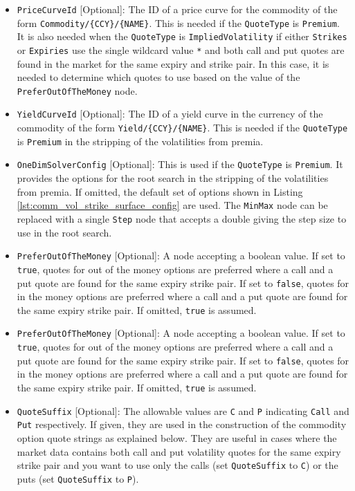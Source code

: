 \begin{itemize}
\item \lstinline!PriceCurveId! [Optional]:
The ID of a price curve for the commodity of the form \lstinline!Commodity/{CCY}/{NAME}!. This is needed if the \lstinline!QuoteType! is \lstinline!Premium!. It is also needed when the \lstinline!QuoteType! is \lstinline!ImpliedVolatility! if either \lstinline!Strikes! or \lstinline!Expiries! use the single wildcard value \lstinline!*! and both call and put quotes are found in the market for the same expiry and strike pair. In this case, it is needed to determine which quotes to use based on the value of the \lstinline!PreferOutOfTheMoney! node.

\item \lstinline!YieldCurveId! [Optional]:
The ID of a yield curve in the currency of the commodity of the form \lstinline!Yield/{CCY}/{NAME}!. This is needed if the \lstinline!QuoteType! is \lstinline!Premium! in the stripping of the volatilities from premia.

\item \lstinline!OneDimSolverConfig! [Optional]:
This is used if the \lstinline!QuoteType! is \lstinline!Premium!. It provides the options for the root search in the stripping of the volatilities from premia. If omitted, the default set of options shown in Listing \ref{lst:comm_vol_strike_surface_config} are used. The \lstinline!MinMax! node can be replaced with a single \lstinline!Step! node that accepts a double giving the step size to use in the root search.

\item \lstinline!PreferOutOfTheMoney! [Optional]:
A node accepting a boolean value. If set to \lstinline!true!, quotes for out of the money options are preferred where a call and a put quote are found for the same expiry strike pair. If set to \lstinline!false!, quotes for in the money options are preferred where a call and a put quote are found for the same expiry strike pair. If omitted, \lstinline!true! is assumed.

\item \lstinline!PreferOutOfTheMoney! [Optional]:
A node accepting a boolean value. If set to \lstinline!true!, quotes for out of the money options are preferred where a call and a put quote are found for the same expiry strike pair. If set to \lstinline!false!, quotes for in the money options are preferred where a call and a put quote are found for the same expiry strike pair. If omitted, \lstinline!true! is assumed.

\item \lstinline!QuoteSuffix! [Optional]:
The allowable values are \lstinline!C! and \lstinline!P! indicating \lstinline!Call! and \lstinline!Put! respectively. If given, they are used in the construction of the commodity option quote strings as explained below. They are useful in cases where the market data contains both call and put volatility quotes for the same expiry strike pair and you want to use only the calls (set \lstinline!QuoteSuffix! to \lstinline!C!) or the puts (set \lstinline!QuoteSuffix! to \lstinline!P!).

\end{itemize}

